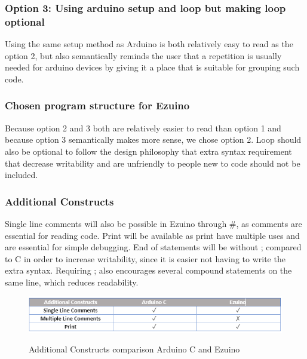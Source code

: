 \subsubsection{Option 3: Using arduino setup and loop but making loop optional}
Using the same setup method as Arduino is both relatively easy to read as the option 2, but also semantically reminds the user that a repetition is usually needed for arduino devices by giving it a place that is suitable for grouping such code.


\subsubsection{Chosen program structure for Ezuino}
Because option 2 and 3 both are relatively easier to read than option 1 and because option 3 semantically makes more sense, we chose option 2. Loop should also be optional to follow the design philosophy that extra syntax requirement that decrease writability and are unfriendly to people new to code should not be included.

\subsubsection*{Additional Constructs}
Single line comments will also be possible in Ezuino through \#, as comments are essential for reading code. Print will be available as print have multiple uses and are essential for simple debugging. End of statements will be without ; compared to C in order to increase writability, since it is easier not having to write the extra syntax. Requiring ; also encourages several compound statements on the same line, which reduces readability.
\begin{figure}[H]
\centering
\caption{Additional Constructs comparison Arduino C and Ezuino}
\includegraphics[scale=0.80]{figures/language_features/langf09.png}
\label{lf09}
\end{figure}

